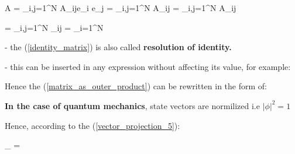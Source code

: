 \documentclass{article}
\begin{document}
\beq \label{matrix_as_outer_product}
A = \sum_{i,j=1}^{N} A_{ij}e_{i} \otimes e_{j} = 
\sum_{i,j=1}^{N} A_{ij}  = 
\sum_{i,j=1}^{N}  A_{ij} 
\eeq

\beq \label{identity_matrix}
 = \sum_{i,j=1}^{N}  \delta_{ij} = 
\sum_{i=1}^{N} 
\eeq

- the (\ref{identity_matrix}) is also called \textbf{resolution of identity.}

- this can be inserted in any expression without affecting its value, for example:



Hence the (\ref{matrix_as_outer_product}) can be rewritten in the form of:







\textbf{In the case of quantum mechanics}, state vectors are normilized i.e $\vert \phi \vert^2 = 1$

Hence, according to the (\ref{vector_projection_5}):

\beq \label{quantum_projection}
_{\phi} \psi =
\ket{\phi}\bra{\phi}\ket{\psi}
\eeq




\end{document}
